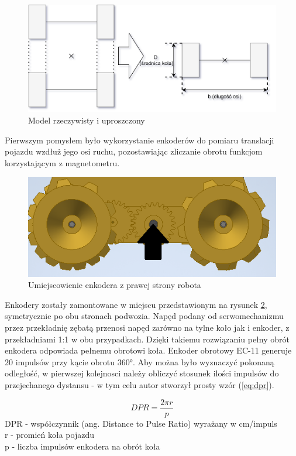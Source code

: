 \begin{figure}[H]
	\centering
		\includegraphics[width=0.8\linewidth]{rys/robot-odometry-simplified.png}
	\caption{Model rzeczywisty i uproszczony }
	\label{fig:odom-axis-simplified}
\end{figure}


Pierwszym pomysłem było wykorzystanie enkoderów do pomiaru translacji pojazdu wzdłuż jego osi ruchu, pozostawiając zliczanie obrotu funkcjom korzystającym z magnetometru.

\begin{figure}[H]
	\centering
		\includegraphics[width=0.6\linewidth]{rys/encoder-position.png}
	\caption{Umiejscowienie enkodera z prawej strony robota}
	\label{fig:encoder-pos}
\end{figure}

Enkodery zostały zamontowane w miejscu przedstawionym na rysunek \ref{fig:encoder-pos}, symetrycznie po obu stronach podwozia. Napęd podany od serwomechanizmu przez przekładnię zębatą przenosi napęd zarówno na tylne koło jak i enkoder, z przekładniami 1:1 w obu przypadkach. Dzięki takiemu rozwiązaniu pełny obrót enkodera odpowiada pełnemu obrotowi koła. Enkoder obrotowy EC-11 generuje 20 impulsów przy kącie obrotu 360°. Aby można było wyznaczyć pokonaną odległość, w pierwszej kolejnosci należy obliczyć stosunek ilości impulsów do przejechanego dystansu - w tym celu autor stworzył prosty wzór (\ref{eq:dpr}).

\begin{equation}
    DPR = \frac{2 \pi r}{p}
    \label{eq:dpr}
\end{equation}
DPR - współczynnik (ang. Distance to Pulse Ratio) wyrażany w cm/impuls \\
r - promień koła pojazdu \\
p - liczba impulsów enkodera na obrót koła \\ \\


